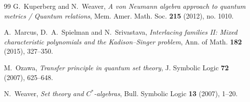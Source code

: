 \documentclass[11pt,reqno]{amsart}
\theoremstyle{definition}
\begin{document}
\begin{thebibliography}{99}
 G.~Kuperberg and N.~Weaver, \emph{A von Neumann algebra
approach to quantum metrics / Quantum relations}, Mem. Amer. Math. Soc. \textbf{215}
(2012), no. 1010.

 A.~Marcus, D.~A.~Spielman and N.~Srivastava, \emph{Interlacing families II:
Mixed characteristic polynomials and the Kadison--Singer problem}, Ann. of Math.
\textbf{182} (2015), 327--350.

 M.~Ozawa, \emph{Transfer principle in quantum set theory}, J. Symbolic
Logic \textbf{72} (2007), 625--648.

 N.~Weaver, \emph{Set theory and $C^*$-algebras}, Bull. Symbolic
Logic \textbf{13} (2007), 1--20.

\end{thebibliography}
\end{document}

